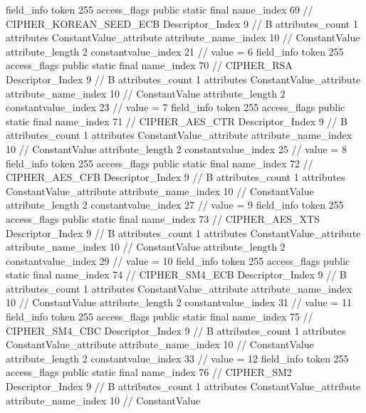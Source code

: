 {{{{{{{				}
				}
			}
			field_info {
				token	255
				access_flags	public static final
				name_index	69		// CIPHER_KOREAN_SEED_ECB
				Descriptor_Index	9		// B
				attributes_count	1
				attributes {
				ConstantValue_attribute {
					attribute_name_index	10		// ConstantValue
					attribute_length	2
					constantvalue_index	21		// value = 6
				}
				}
			}
			field_info {
				token	255
				access_flags	public static final
				name_index	70		// CIPHER_RSA
				Descriptor_Index	9		// B
				attributes_count	1
				attributes {
				ConstantValue_attribute {
					attribute_name_index	10		// ConstantValue
					attribute_length	2
					constantvalue_index	23		// value = 7
				}
				}
			}
			field_info {
				token	255
				access_flags	public static final
				name_index	71		// CIPHER_AES_CTR
				Descriptor_Index	9		// B
				attributes_count	1
				attributes {
				ConstantValue_attribute {
					attribute_name_index	10		// ConstantValue
					attribute_length	2
					constantvalue_index	25		// value = 8
				}
				}
			}
			field_info {
				token	255
				access_flags	public static final
				name_index	72		// CIPHER_AES_CFB
				Descriptor_Index	9		// B
				attributes_count	1
				attributes {
				ConstantValue_attribute {
					attribute_name_index	10		// ConstantValue
					attribute_length	2
					constantvalue_index	27		// value = 9
				}
				}
			}
			field_info {
				token	255
				access_flags	public static final
				name_index	73		// CIPHER_AES_XTS
				Descriptor_Index	9		// B
				attributes_count	1
				attributes {
				ConstantValue_attribute {
					attribute_name_index	10		// ConstantValue
					attribute_length	2
					constantvalue_index	29		// value = 10
				}
				}
			}
			field_info {
				token	255
				access_flags	public static final
				name_index	74		// CIPHER_SM4_ECB
				Descriptor_Index	9		// B
				attributes_count	1
				attributes {
				ConstantValue_attribute {
					attribute_name_index	10		// ConstantValue
					attribute_length	2
					constantvalue_index	31		// value = 11
				}
				}
			}
			field_info {
				token	255
				access_flags	public static final
				name_index	75		// CIPHER_SM4_CBC
				Descriptor_Index	9		// B
				attributes_count	1
				attributes {
				ConstantValue_attribute {
					attribute_name_index	10		// ConstantValue
					attribute_length	2
					constantvalue_index	33		// value = 12
				}
				}
			}
			field_info {
				token	255
				access_flags	public static final
				name_index	76		// CIPHER_SM2
				Descriptor_Index	9		// B
				attributes_count	1
				attributes {
				ConstantValue_attribute {
					attribute_name_index	10		// ConstantValue
}}}}}}}
